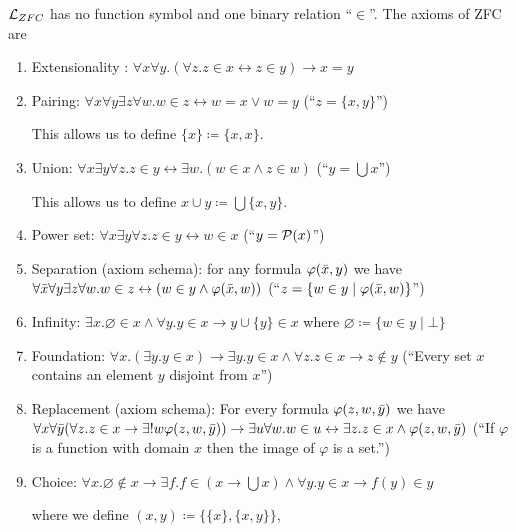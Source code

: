 \begin{boxdef}
\begin{defi}
    \alert{$\mathcal{L}_{ZFC}$} has no function symbol and one binary relation ``$\in$''. 
    The axioms of ZFC are
    \begin{enumerate}
        \item Extensionality : $\forall x \forall y. (\forall z. z \in x \leftrightarrow z \in y) \to x = y$
        \item Pairing: $\forall x \forall y \exists z \forall w. w \in z \leftrightarrow w = x \lor w = y$ (``$z = \{x,y\}$'')
        
        This allows us to define $\{x\} \coloneq \{x, x\}$.
        \item Union: $\forall x \exists y \forall z. z \in y \leftrightarrow \exists w. (w \in x \wedge z \in w)$ (``$y = \bigcup x$'')
        
        This allows us to define $x \cup y \coloneq \bigcup \{x, y\}$.
        \item Power set: $\forall x \exists y \forall z. z \in y \leftrightarrow w \in x$ (``$y = \mathcal{P}(x)$'')
        \item Separation (axiom schema): for any formula $\varphi(\bar{x}, y)$ we have $\forall \bar{x} \forall y \exists z \forall w. w \in z \leftrightarrow (w \in y \wedge \varphi(\bar{x}, w))$ (``$z = \{ w \in y \mid \varphi(\bar{x}, w)\}$'')
        \item Infinity: $\exists x. \varnothing \in x \wedge \forall y. y \in x \to y \cup \{y\} \in x$ where $\varnothing \coloneq \{w \in y \mid \bot\}$
        \item Foundation: $\forall x. (\exists y. y \in x) \to \exists y. y \in x \wedge \forall z. z \in x \to z \notin y$ (``Every set $x$ contains an element $y$ disjoint from $x$'')
        \item Replacement (axiom schema): For every formula $\varphi(z, w, \bar{y})$ we have $\forall x \forall \bar{y} (\forall z. z \in x \to \exists! w \varphi(z, w, \bar{y})) \to \exists u \forall w. w \in u \leftrightarrow \exists z. z \in x \wedge \varphi(z, w, \bar{y})$ (``If $\varphi$ is a function with domain $x$ then the image of $\varphi$ is a set.'')
        \item Choice: $\forall x. \varnothing \notin x \to \exists f. f \in (x \to \bigcup x) \wedge \forall y. y \in x  \to f(y) \in y$
        
        where we define $(x , y) \coloneq \{\{x\}, \{x, y\}\}$, 
        

\end{enumerate}
\end{defi}
\end{boxdef}
